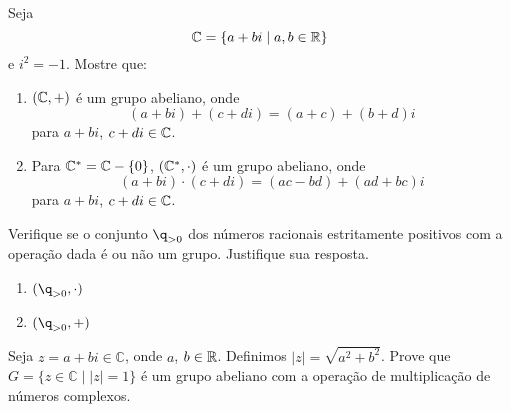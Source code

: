 \documentclass[12pt]{article}
\begin{document}
\vesp

\questao Seja
\[
	\mathbb{C} = \{a + bi \mid a, b \in \mathbb{R}\}
\]
e $i^2 = -1$. Mostre que:
\begin{enumerate}[label=({\alph*})]
	\item $(\mathbb{C}, +)$ \'e um grupo abeliano, onde
	\[
		(a + bi) + (c + di) = (a + c) + (b + d)i 
	\]
	para $a + bi$, $c + di \in \mathbb{C}$.
	\item Para $\mathbb{C}^* = \mathbb{C} - \{0\}$, $(\mathbb{C}^*, \cdot)$ \'e um grupo abeliano, onde
	\[
		(a + bi)\cdot (c + di) = (ac - bd) + (ad + bc)i 
	\]
	para $a + bi$, $c + di \in \mathbb{C}$.
\end{enumerate}

\vesp

\questao Verifique se o conjunto $\q_{>0}$ dos n{\'u}meros racionais estritamente positivos com a
 opera{\c c}{\~a}o dada {\'e} ou n{\~a}o um grupo. Justifique sua
resposta.
\begin{multicols}{2}
\begin{enumerate}[label=({\alph*})]
\item $(\q_{>0},\cdot)$
\item $(\q_{>0}, +)$
\end{enumerate}
\end{multicols}

\vesp




\vesp

\questao Seja $z  = a + bi \in \mathbb{C}$, onde $a$, $b \in \mathbb{R}$. Definimos $|z| = \sqrt{a^2 + b^2}$. Prove que $G=\{z \in \mathbb{C} \mid |z| = 1\}$ {\'e} um grupo
abeliano com a opera{\c c}{\~a}o de multiplica{\c c}{\~a}o de n{\'u}meros complexos.
\end{document}
